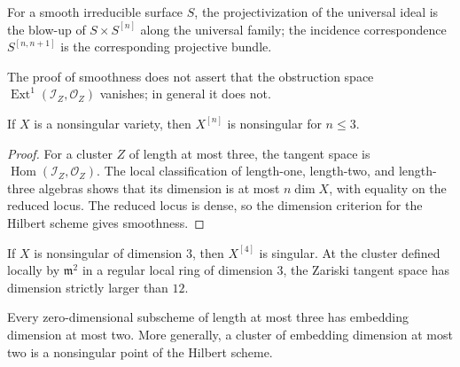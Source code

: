 \begin{remark}\label{fga-rem-7-2-2}\uses{}
For a smooth irreducible surface $S$, the projectivization of the universal ideal
is the blow-up of $S\times S^{[n]}$ along the universal family; the incidence
correspondence $S^{[n,n+1]}$ is the corresponding projective bundle.
\end{remark}

\begin{remark}[obstructions]\label{fga-rem-7-2-4}
The proof of smoothness does not assert that the obstruction space
$\operatorname{Ext}^{1}(\mathcal I_Z,\mathcal O_Z)$ vanishes; in general it does
not.
\end{remark}

\begin{remark}\label{fga-rem-7-2-5}
If $X$ is a nonsingular variety, then $X^{[n]}$ is nonsingular for $n\le3$.
\end{remark}
\begin{proof}
For a cluster $Z$ of length at most three, the tangent space is
$\operatorname{Hom}(\mathcal I_Z,\mathcal O_Z)$.  The local classification of
length-one, length-two, and length-three algebras shows that its dimension is at
most $n\dim X$, with equality on the reduced locus.  The reduced locus is dense,
so the dimension criterion for the Hilbert scheme gives smoothness.
\end{proof}

\begin{remark}\label{fga-rem-7-2-6}
If $X$ is nonsingular of dimension $3$, then $X^{[4]}$ is singular.  At the
cluster defined locally by $\mathfrak m^2$ in a regular local ring of dimension
$3$, the Zariski tangent space has dimension strictly larger than $12$.
\end{remark}

\begin{remark}\label{fga-rem-7-2-7}
Every zero-dimensional subscheme of length at most three has embedding dimension
at most two.  More generally, a cluster of embedding dimension at most two is a
nonsingular point of the Hilbert scheme.
\end{remark}

